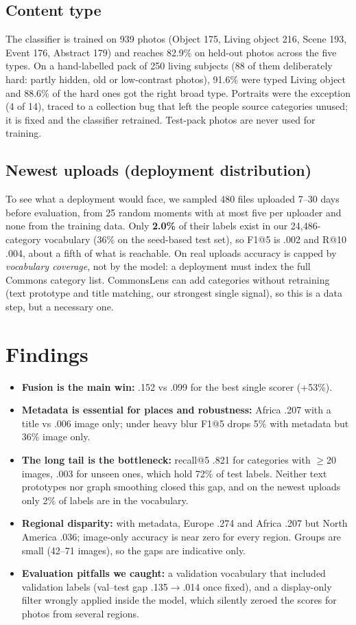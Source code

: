 \documentclass[10pt,twocolumn]{article}
\begin{document}
\subsection{Content type}
The classifier is trained on 939 photos (Object 175, Living object 216, Scene 193, Event 176, Abstract
179) and reaches 82.9\% on held-out photos across the five types. On a hand-labelled pack of 250
living subjects (88 of them deliberately hard: partly hidden, old or low-contrast photos), 91.6\% were typed
Living object and 88.6\% of the hard ones got the right broad type. Portraits were the exception (4 of 14),
traced to a collection bug that left the people source categories unused; it is fixed and the classifier
retrained. Test-pack photos are never used for training.

\subsection{Newest uploads (deployment distribution)}
To see what a deployment would face, we sampled 480 files uploaded 7--30 days before evaluation,
from 25 random moments with at most five per uploader and none from the training data. Only
\textbf{2.0\%} of their labels exist in our 24,486-category vocabulary (36\% on the seed-based test set),
so F1@5 is .002 and R@10 .004, about a fifth of what is reachable. On real uploads accuracy is capped by
\emph{vocabulary coverage}, not by the model: a deployment must index the full Commons category list.
CommonsLens can add categories without retraining (text prototype and title matching, our strongest
single signal), so this is a data step, but a necessary one.

\section{Findings}
\begin{itemize}
\item \textbf{Fusion is the main win:} .152 vs .099 for the best single scorer (+53\%).
\item \textbf{Metadata is essential for places and robustness:} Africa .207 with a title vs .006 image only;
under heavy blur F1@5 drops 5\% with metadata but 36\% image only.
\item \textbf{The long tail is the bottleneck:} recall@5 .821 for categories with $\geq$20 images, .003 for
unseen ones, which hold 72\% of test labels. Neither text prototypes nor graph smoothing closed this gap,
and on the newest uploads only 2\% of labels are in the vocabulary.
\item \textbf{Regional disparity:} with metadata, Europe .274 and Africa .207 but North America .036;
image-only accuracy is near zero for every region. Groups are small (42--71 images), so the gaps are
indicative only.
\item \textbf{Evaluation pitfalls we caught:} a validation vocabulary that included validation labels
(val--test gap .135$\rightarrow$.014 once fixed), and a display-only filter wrongly applied inside the
model, which silently zeroed the scores for photos from several regions.
\end{itemize}
\end{document}
